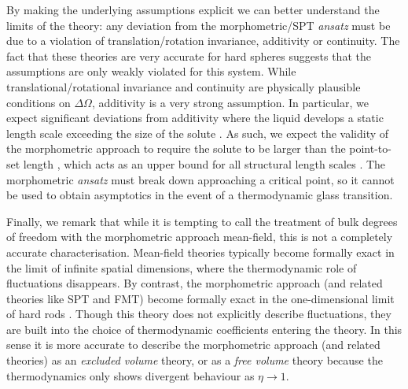\documentclass[11pt,twoside]{report}
\def\includebibliography{}
\begin{document}
By making the underlying assumptions explicit we can better understand the limits of the theory: any deviation from the morphometric/SPT \emph{ansatz} must be due to a violation of translation/rotation invariance, additivity or continuity.
The fact that these theories are very accurate for hard spheres suggests that the assumptions are only weakly violated for this system.
While translational/rotational invariance and continuity are physically plausible conditions on $\Delta \Omega$, additivity is a very strong assumption.
In particular, we expect significant deviations from additivity where the liquid develops a static length scale exceeding the size of the solute \cite{KonigPRL2004}.
As such, we expect the validity of the morphometric approach to require the solute to be larger than the point-to-set length \cite{MontanariJSP2006}, which acts as an upper bound for all structural length scales \cite{YaidaPRE2016}.
The morphometric \emph{ansatz} must break down approaching a critical point, so it cannot be used to obtain asymptotics in the event of a thermodynamic glass transition.

Finally, we remark that while it is tempting to call the treatment of bulk degrees of freedom with the morphometric approach mean-field, this is not a completely accurate characterisation.
Mean-field theories typically become formally exact in the limit of infinite spatial dimensions, where the thermodynamic role of fluctuations disappears.
By contrast, the morphometric approach (and related theories like SPT and FMT) become formally exact in the one-dimensional limit of hard rods%
.
Though this theory does not explicitly describe fluctuations, they are built into the choice of thermodynamic coefficients entering the theory.
In this sense it is more accurate to describe the morphometric approach (and related theories) as an \emph{excluded volume} theory, or as a \emph{free volume} theory because the thermodynamics only shows divergent behaviour as $\eta \to 1$.


\ifdefined\includebibliography
  \printbibliography
\fi
\end{document}
